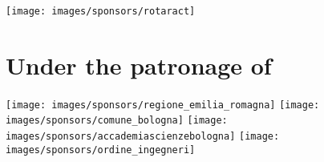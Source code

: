 \begin{center}
\begin{multicols}{4}
\texttt{[image: images/sponsors/rotaract]} 
\end{multicols}

\section*{Under the patronage of}
\vspace{0.1cm}

\begin{multicols}{4}
\texttt{[image: images/sponsors/regione\_emilia\_romagna]}
\texttt{[image: images/sponsors/comune\_bologna]}
\texttt{[image: images/sponsors/accademiascienzebologna]}
\texttt{[image: images/sponsors/ordine\_ingegneri]}
\end{multicols}

\end{center}
\setlength{\columnseprule}{1pt}


